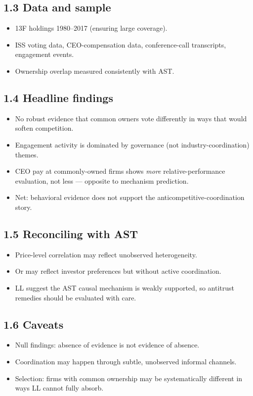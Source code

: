 \documentclass[11pt]{article}
\begin{document}
\subsection*{1.3 Data and sample}
\begin{itemize}
\item 13F holdings 1980--2017 (ensuring large coverage).
\item ISS voting data, CEO-compensation data, conference-call transcripts, engagement events.
\item Ownership overlap measured consistently with AST.
\end{itemize}

\subsection*{1.4 Headline findings}
\begin{itemize}
\item No robust evidence that common owners vote differently in ways that would soften competition.
\item Engagement activity is dominated by governance (not industry-coordination) themes.
\item CEO pay at commonly-owned firms shows \emph{more} relative-performance evaluation, not less --- opposite to mechanism prediction.
\item Net: behavioral evidence does not support the anticompetitive-coordination story.
\end{itemize}

\subsection*{1.5 Reconciling with AST}
\begin{itemize}
\item Price-level correlation may reflect unobserved heterogeneity.
\item Or may reflect investor preferences but without active coordination.
\item LL suggest the AST causal mechanism is weakly supported, so antitrust remedies should be evaluated with care.
\end{itemize}

\subsection*{1.6 Caveats}
\begin{alertbox}
\begin{itemize}
\item Null findings: absence of evidence is not evidence of absence.
\item Coordination may happen through subtle, unobserved informal channels.
\item Selection: firms with common ownership may be systematically different in ways LL cannot fully absorb.
\end{itemize}
\end{alertbox}
\end{document}
